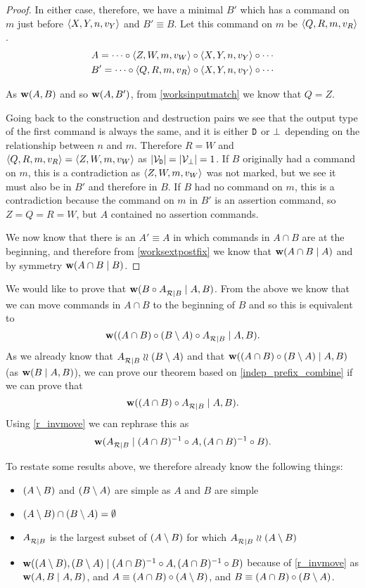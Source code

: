 \begin{proof}
In either case, therefore,
we have a minimal $B'$ which has a command on $m$ just before $\langle{X,Y,n,v_Y}\rangle$ and $B'\equiv B$.
Let this command on $m$ be $\langle{Q,R,m,v_R}\rangle$.
\begin{gather*}
A = \cdots\circ  \langle{Z,W,m,v_W}\rangle\circ  \langle{X,Y,n,v_Y}\rangle\circ  \cdots \\
B' = \cdots\circ  \langle{Q,R,m,v_R}\rangle\circ  \langle{X,Y,n,v_Y}\rangle\circ  \cdots
\end{gather*}

As $\mathbf{w}({A,B})$ and so $\mathbf{w}({A,B'})$, 
from \cref{worksinputmatch}
we know that $Q=Z$. 

Going back to the construction and destruction pairs we see that the output type of the first command
is always the same, and it is either $\mathtt{D}$ or $\bot$ depending on the relationship between $n$ and $m$.
Therefore $R=W$ and $\langle{Q,R,m,v_R}\rangle=\langle{Z,W,m,v_W}\rangle$
as $|\mathcal{V}_{\mathtt{D}}|=|\mathcal{V}_{\bot}|=1$. 
If $B$ originally had a command on $m$,
this is a contradiction as $\langle{Z,W,m,v_W}\rangle$ was not marked, but we see it must also be in $B'$ and therefore in $B$.
If $B$ had no command on $m$,
this is a contradiction because the command on $m$ in $B'$ is an assertion command, so $Z=Q=R=W$, 
but $A$ contained no assertion commands.

We now know that there is an $A'\equiv A$ in which commands in $A\cap B$
are at the beginning, and therefore 
from \cref{worksextpostfix} we know that
$\mathbf{w}({A\cap B}\mathrel{|}{A})$ and by symmetry $\mathbf{w}({A\cap B}\mathrel{|}{B})$.
\end{proof}

\bigskip

\noindent
We would like to prove that $\mathbf{w}({B\circ {A}^{}_{\mathcal{R}|{B}}}\mathrel{|}{A,B})$.
From the above we know that we can move commands in $A\cap B$
to the beginning of $B$ and so this is equivalent to
\[ \mathbf{w}({(A\cap B)\circ (B\setminus A)\circ {A}^{}_{\mathcal{R}|{B}}}\mathrel{|}{A,B}). \]
As we already know that ${A}^{}_{\mathcal{R}|{B}}\mathrel{\wr\wr}(B\setminus A)$
and that $\mathbf{w}({(A\cap B)\circ (B\setminus A)}\mathrel{|}{A,B})$
(as $\mathbf{w}({B}\mathrel{|}{A,B})$),
we can prove our theorem based on \cref{indep_prefix_combine}
if we can prove that
\[ \mathbf{w}({(A\cap B)\circ {A}^{}_{\mathcal{R}|{B}}}\mathrel{|}{A,B}). \]
Using \cref{r_invmove} we can rephrase this as
\[ \mathbf{w}({{A}^{}_{\mathcal{R}|{B}}}\mathrel{|}{(A\cap B)^{-1}\circ A,(A\cap B)^{-1}\circ B}). \]

To restate some results above, we therefore already know the following things:
\begin{itemize}
\item $(A\setminus B)$ and $(B\setminus A)$ are simple as $A$ and $B$ are simple
\item $(A\setminus B) \cap (B\setminus A) = \emptyset$
\item ${A}^{}_{\mathcal{R}|{B}}$ is the largest subset of $(A\setminus B)$ for which ${A}^{}_{\mathcal{R}|{B}}\mathrel{\wr\wr}(A\setminus B)$
\item $\mathbf{w}({(A\setminus B), (B\setminus A)}\mathrel{|}{(A\cap B)^{-1}\circ A,(A\cap B)^{-1}\circ B})$ 
because of \cref{r_invmove}
as $\mathbf{w}({A,B}\mathrel{|}{A,B})$,
and $A\equiv(A\cap B)\circ(A\setminus B)$, and $B\equiv(A\cap B)\circ(B\setminus A)$.
\end{itemize}

